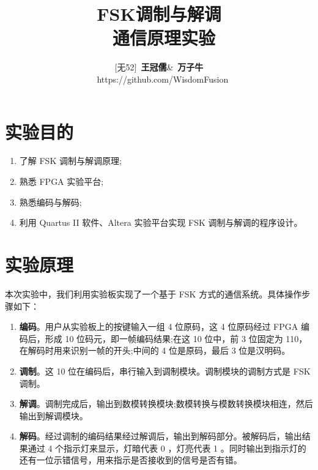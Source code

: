 \documentclass{progartcn}
\title{\bfseries\sffamily
  FSK调制与解调\\
  \normalfont\zihao{-3}
   通信原理实验
}
\author{[无52]\ \textbf{王冠儒}\quad \&\quad [无52]\ \textbf{万子牛} \\ \faGithubAlt~ https://github.com/WisdomFusion}
\date{}
\begin{document}
\sloppy %


\maketitle
\thispagestyle{empty}


\section{实验目的}
\label{newfeatures}

\begin{enumerate}
  \item 了解 FSK 调制与解调原理;

  \item 熟悉 FPGA 实验平台;

  \item 熟悉编码与解码;

  \item 利用 Quartus II 软件、Altera 实验平台实现 FSK 调制与解调的程序设计。
\end{enumerate}

\section{实验原理}

本次实验中，我们利用实验板实现了一个基于 FSK 方式的通信系统。具体操作步骤如下：

\begin{enumerate}
  \item \textbf{编码}。用户从实验板上的按键输入一组 4 位原码，这 4 位原码经过 FPGA 编码后，形成 10 位码元，即一帧编码结果;在这 10 位中，前 3 位固定为 110，在解码时用来识别一帧的开头;中间的 4 位是原码，最后 3 位是汉明码。
  
  \item \textbf{调制}。这 10 位在编码后，串行输入到调制模块。调制模块的调制方式是 FSK 调制。

  \item \textbf{解调}。调制完成后，输出到数模转换模块;数模转换与模数转换模块相连，然后输出到解调模块。

  \item \textbf{解码}。经过调制的编码结果经过解调后，输出到解码部分。被解码后，输出结果通过 4 个指示灯来显示，灯暗代表 0 ，灯亮代表 1 。同时输出到指示灯的还有一位示错信号，用来指示是否接收到的信号是否有错。

\end{enumerate}
\end{document}
